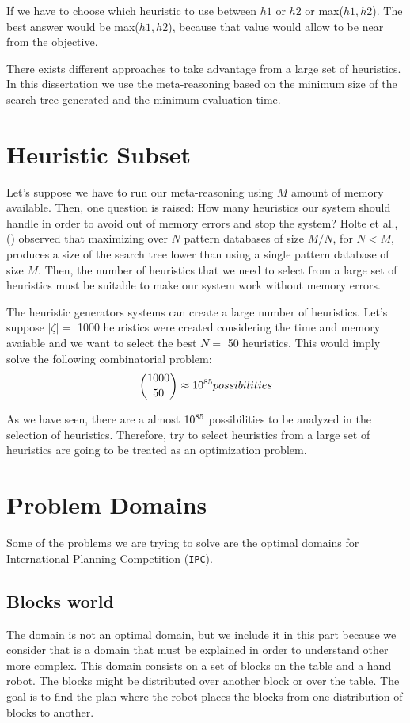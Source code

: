 If we have to choose which heuristic to use between $h1$ or $h2$ or max($h1, h2$). The best answer would be max($h1, h2$), because that value would allow to be near from the objective.

There exists different approaches to take advantage from a large set of heuristics. In this dissertation we use the meta-reasoning based on the minimum size of the search tree generated and the minimum evaluation time.

\section{Heuristic Subset}
Let's suppose we have to run our meta-reasoning using $M$ amount of memory available. Then, one question is raised: How many heuristics our system should handle in order to avoid out of memory errors and stop the system? Holte et al., (\citeyear{holte2006maximizing}) observed that maximizing over $N$ pattern databases of size $M/N$, for $N < M$, produces a size of the search tree lower than using a single pattern database of size $M$. Then, the number of heuristics that we need to select from a large set of heuristics must be suitable to make our system work without memory errors.

The heuristic generators systems can create a large number of heuristics. Let's suppose $|\zeta| = $ 1000 heuristics were created considering the time and memory avaiable and we want to select the best $N =$ 50 heuristics. This would imply solve the following combinatorial problem: $${1000\choose 50} \approx 10\sp{85} possibilities$$

As we have seen, there are a almost $10\sp{85}$ possibilities to be analyzed in the selection of heuristics. Therefore, try to select heuristics from a large set of heuristics are going to be treated as an optimization problem.

\section{Problem Domains}
Some of the problems we are trying to solve are the optimal domains for International Planning Competition (\texttt{IPC}).

\subsection{Blocks world}
The domain is not an optimal domain, but we include it in this part because we consider that is a domain that must be explained in order to understand other more complex. This domain consists on a set of blocks on the table and a hand robot. The blocks might be distributed over another block or over the table. The goal is to find the plan where the robot places the blocks from one distribution of blocks to another.

